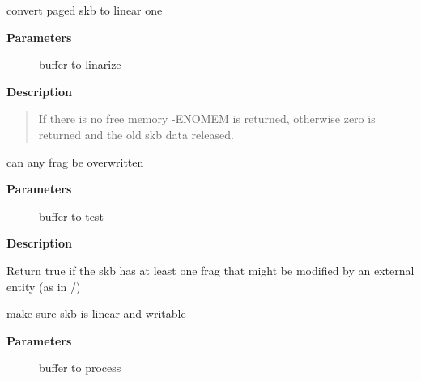 \documentclass[a4paper,8pt,english]{sphinxmanual}
\begin{document}
\begin{fulllineitems}
\label{networking/kapi:c.skb_linearize}
convert paged skb to linear one

\end{fulllineitems}


\textbf{Parameters}
\begin{description}
\item[{}] \leavevmode
buffer to linarize

\end{description}

\textbf{Description}
\begin{quote}

If there is no free memory -ENOMEM is returned, otherwise zero
is returned and the old skb data released.
\end{quote}

\begin{fulllineitems}
\label{networking/kapi:c.skb_has_shared_frag}
can any frag be overwritten

\end{fulllineitems}


\textbf{Parameters}
\begin{description}
\item[{}] \leavevmode
buffer to test

\end{description}

\textbf{Description}

Return true if the skb has at least one frag that might be modified
by an external entity (as in /)

\begin{fulllineitems}
\label{networking/kapi:c.skb_linearize_cow}
make sure skb is linear and writable

\end{fulllineitems}


\textbf{Parameters}
\begin{description}
\item[{}] \leavevmode
buffer to process

\end{description}
\end{document}
